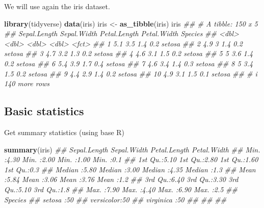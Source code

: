 \documentclass[
  notitlepage]{book}
\newenvironment{Shaded}{\begin{snugshade}}{\end{snugshade}}
\newcommand{\CommentTok}[1]{\textcolor[rgb]{0.56,0.35,0.01}{\textit{#1}}}
\newcommand{\KeywordTok}[1]{\textcolor[rgb]{0.13,0.29,0.53}{\textbf{#1}}}
\newcommand{\NormalTok}[1]{#1}
\newcommand{\StringTok}[1]{\textcolor[rgb]{0.31,0.60,0.02}{#1}}
\begin{document}
We will use again the iris dataset.

\begin{Shaded}
\begin{Highlighting}[]
\KeywordTok{library}\NormalTok{(tidyverse)}
\KeywordTok{data}\NormalTok{(iris)}
\NormalTok{iris \textless{}{-}}\StringTok{ }\KeywordTok{as\_tibble}\NormalTok{(iris)}
\NormalTok{iris}
\CommentTok{\#\# \# A tibble: 150 x 5}
\CommentTok{\#\#    Sepal.Length Sepal.Width Petal.Length Petal.Width Species}
\CommentTok{\#\#           \textless{}dbl\textgreater{}       \textless{}dbl\textgreater{}        \textless{}dbl\textgreater{}       \textless{}dbl\textgreater{} \textless{}fct\textgreater{}  }
\CommentTok{\#\#  1          5.1         3.5          1.4         0.2 setosa }
\CommentTok{\#\#  2          4.9         3            1.4         0.2 setosa }
\CommentTok{\#\#  3          4.7         3.2          1.3         0.2 setosa }
\CommentTok{\#\#  4          4.6         3.1          1.5         0.2 setosa }
\CommentTok{\#\#  5          5           3.6          1.4         0.2 setosa }
\CommentTok{\#\#  6          5.4         3.9          1.7         0.4 setosa }
\CommentTok{\#\#  7          4.6         3.4          1.4         0.3 setosa }
\CommentTok{\#\#  8          5           3.4          1.5         0.2 setosa }
\CommentTok{\#\#  9          4.4         2.9          1.4         0.2 setosa }
\CommentTok{\#\# 10          4.9         3.1          1.5         0.1 setosa }
\CommentTok{\#\# \# i 140 more rows}
\end{Highlighting}
\end{Shaded}

\hypertarget{basic-statistics}{%
\subsection{Basic statistics}\label{basic-statistics}}

Get summary statistics (using base R)

\begin{Shaded}
\begin{Highlighting}[]
\KeywordTok{summary}\NormalTok{(iris)}
\CommentTok{\#\#   Sepal.Length   Sepal.Width    Petal.Length   Petal.Width }
\CommentTok{\#\#  Min.   :4.30   Min.   :2.00   Min.   :1.00   Min.   :0.1  }
\CommentTok{\#\#  1st Qu.:5.10   1st Qu.:2.80   1st Qu.:1.60   1st Qu.:0.3  }
\CommentTok{\#\#  Median :5.80   Median :3.00   Median :4.35   Median :1.3  }
\CommentTok{\#\#  Mean   :5.84   Mean   :3.06   Mean   :3.76   Mean   :1.2  }
\CommentTok{\#\#  3rd Qu.:6.40   3rd Qu.:3.30   3rd Qu.:5.10   3rd Qu.:1.8  }
\CommentTok{\#\#  Max.   :7.90   Max.   :4.40   Max.   :6.90   Max.   :2.5  }
\CommentTok{\#\#        Species  }
\CommentTok{\#\#  setosa    :50  }
\CommentTok{\#\#  versicolor:50  }
\CommentTok{\#\#  virginica :50  }
\CommentTok{\#\#                 }
\CommentTok{\#\#                 }
\CommentTok{\#\# }
\end{Highlighting}
\end{Shaded}
\end{document}
